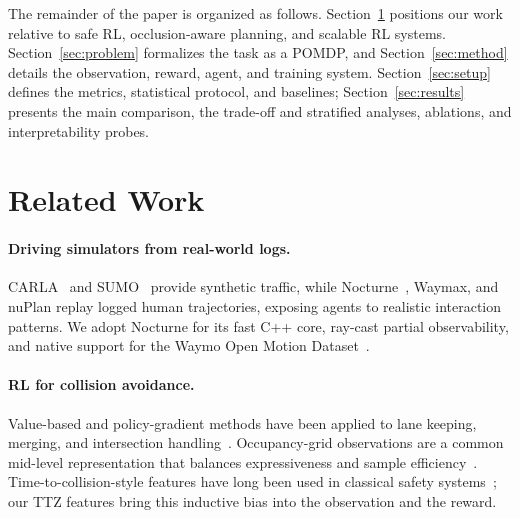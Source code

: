 \documentclass{article}
\begin{document}
The remainder of the paper is organized as follows. Section~\ref{sec:related}
positions our work relative to safe RL, occlusion-aware planning, and
scalable RL systems. Section~\ref{sec:problem} formalizes the task as a
POMDP, and Section~\ref{sec:method} details the observation, reward, agent,
and training system. Section~\ref{sec:setup} defines the metrics,
statistical protocol, and baselines; Section~\ref{sec:results} presents the
main comparison, the trade-off and stratified analyses, ablations, and
interpretability probes.

\section{Related Work}
\label{sec:related}

\paragraph{Driving simulators from real-world logs.}
CARLA~\citep{dosovitskiy2017carla} and SUMO~\citep{lopez2018sumo} provide
synthetic traffic, while Nocturne~\citep{vinitsky2022nocturne}, Waymax, and
nuPlan replay logged human trajectories, exposing agents to realistic
interaction patterns. We adopt Nocturne for its fast C++ core, ray-cast
partial observability, and native support for the Waymo Open Motion
Dataset~\citep{ettinger2021waymo}.

\paragraph{RL for collision avoidance.}
Value-based and policy-gradient methods have been applied to lane keeping,
merging, and intersection handling~\citep{kiran2021deep, isele2018navigating}.
Occupancy-grid observations are a common mid-level representation that
balances expressiveness and sample efficiency~\citep{fridman2018deeptraffic}.
Time-to-collision-style features have long been used in classical
safety systems~\citep{minderhoud2001extended}; our TTZ features bring this
inductive bias into the observation and the reward.
\end{document}
